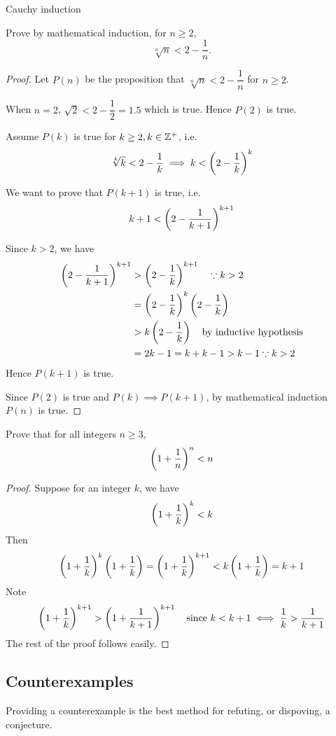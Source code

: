Cauchy induction
\pagebreak

\begin{prbm}[FM/TJC/2023]
Prove by mathematical induction, for $n \ge 2$,
\[ \sqrt[n]{n}<2 - \frac{1}{n}. \]
\end{prbm}

\begin{proof}
Let $P(n)$ be the proposition that $\sqrt[n]{n}<2 - \dfrac{1}{n}$ for $n \ge 2$.

When $n=2$, $\sqrt{2} <2-\dfrac{1}{2}=1.5$ which is true. Hence $P(2)$ is true.

Assume $P(k)$ is true for $k \ge 2, k \in \mathbb Z^+$, i.e.
\[ \sqrt[k]{k}<2 - \dfrac{1}{k} \implies k<\left(2-\frac{1}{k}\right)^k \]

We want to prove that $P(k+1)$ is true, i.e.
\[ k+1<\left(2-\frac{1}{k+1}\right)^{k+1} \]

Since $k>2$, we have 
\begin{align*}
\left(2-\frac{1}{k+1}\right)^{k+1}
&> \left(2-\frac{1}{k}\right)^{k+1} \quad \because k>2 \\
&= \left(2-\frac{1}{k}\right)^k\left(2-\frac{1}{k}\right) \\
&> k\left(2-\frac{1}{k}\right) \quad \text{by inductive hypothesis} \\
&= 2k-1 = k+k-1 > k-1 \because k>2
\end{align*}
Hence $P(k+1)$ is true.

Since $P(2)$ is true and $P(k)\implies P(k+1)$, by mathematical induction $P(n)$ is true.
\end{proof}
\pagebreak

\begin{prbm}
Prove that for all integers $n \ge 3$, 
\[ \left(1+\frac{1}{n}\right)^n<n \]
\end{prbm}

\begin{proof}
Suppose for an integer $k$, we have 
\[ \left(1+\frac{1}{k}\right)^k<k \]
Then
\[ \left(1+\frac{1}{k}\right)^k\left(1+\frac{1}{k}\right) = \left(1+\frac{1}{k}\right)^{k+1}<k\left(1+\frac{1}{k}\right) = k+1  \]
Note 
\[ \left(1+\frac{1}{k}\right)^{k+1} > \left(1+\frac{1}{k+1}\right)^{k+1} \quad \text{since } k<k+1 \iff \frac{1}{k}>\frac{1}{k+1} \]
The rest of the proof follows easily.
\end{proof}
\pagebreak

\subsection{Counterexamples}
Providing a counterexample is the best method for refuting, or dispoving, a conjecture. 

